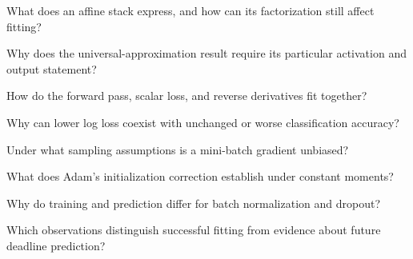 \begin{studyquestions}
\item What does an affine stack express, and how can its factorization still affect fitting?
\item Why does the universal-approximation result require its particular activation and output statement?
\item How do the forward pass, scalar loss, and reverse derivatives fit together?
\item Why can lower log loss coexist with unchanged or worse classification accuracy?
\item Under what sampling assumptions is a mini-batch gradient unbiased?
\item What does Adam's initialization correction establish under constant moments?
\item Why do training and prediction differ for batch normalization and dropout?
\item Which observations distinguish successful fitting from evidence about future deadline prediction?
\end{studyquestions}

